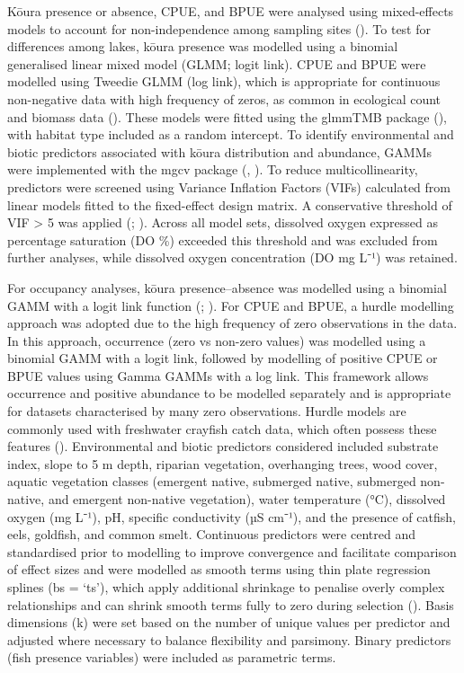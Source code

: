 \documentclass[
  letterpaper,
  DIV=11,
  numbers=noendperiod]{scrartcl}
\begin{document}
Kōura presence or absence, CPUE, and BPUE were analysed using
mixed-effects models to account for non-independence among sampling
sites (). To test for
differences among lakes, kōura presence was modelled using a binomial
generalised linear mixed model (GLMM; logit link). CPUE and BPUE were
modelled using Tweedie GLMM (log link), which is appropriate for
continuous non-negative data with high frequency of zeros, as common in
ecological count and biomass data (). These models were fitted using the glmmTMB package
(), with habitat type
included as a random intercept. To identify environmental and biotic
predictors associated with kōura distribution and abundance, GAMMs were
implemented with the mgcv package (,
). To reduce multicollinearity, predictors
were screened using Variance Inflation Factors (VIFs) calculated from
linear models fitted to the fixed-effect design matrix. A conservative
threshold of VIF \textgreater{} 5 was applied
(;
). Across all model sets,
dissolved oxygen expressed as percentage saturation (DO \%) exceeded
this threshold and was excluded from further analyses, while dissolved
oxygen concentration (DO mg L⁻¹) was retained.

For occupancy analyses, kōura presence--absence was modelled using a
binomial GAMM with a logit link function (; ). For CPUE and BPUE,
a hurdle modelling approach was adopted due to the high frequency of
zero observations in the data. In this approach, occurrence (zero vs
non-zero values) was modelled using a binomial GAMM with a logit link,
followed by modelling of positive CPUE or BPUE values using Gamma GAMMs
with a log link. This framework allows occurrence and positive abundance
to be modelled separately and is appropriate for datasets characterised
by many zero observations. Hurdle models are commonly used with
freshwater crayfish catch data, which often possess these features
(). Environmental
and biotic predictors considered included substrate index, slope to 5 m
depth, riparian vegetation, overhanging trees, wood cover, aquatic
vegetation classes (emergent native, submerged native, submerged
non-native, and emergent non-native vegetation), water temperature (°C),
dissolved oxygen (mg L⁻¹), pH, specific conductivity (µS cm⁻¹), and the
presence of catfish, eels, goldfish, and common smelt. Continuous
predictors were centred and standardised prior to modelling to improve
convergence and facilitate comparison of effect sizes and were modelled
as smooth terms using thin plate regression splines (bs = `ts'), which
apply additional shrinkage to penalise overly complex relationships and
can shrink smooth terms fully to zero during selection
(). Basis dimensions (k) were set
based on the number of unique values per predictor and adjusted where
necessary to balance flexibility and parsimony. Binary predictors (fish
presence variables) were included as parametric terms.
\end{document}
